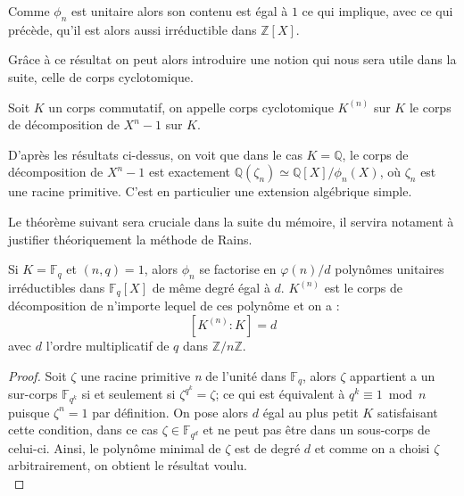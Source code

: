 \documentclass[a4paper]{article} %
\numberwithin{section}{part}
\numberwithin{equation}{section}
\newcommand\nroot[1]{\textit{#1}\up{\textit{ième}}}
\newcommand\zmodn[1]{\mathbb{Z}/#1\mathbb{Z}}
\newcommand\GF[1]{\mathbb{F}_{#1}}
\begin{document}
\begin{rem}
Comme $\phi_n$ est unitaire alors son contenu est égal à $1$ ce qui implique, 
avec ce qui précède, qu'il est alors aussi irréductible dans $\mathbb{Z}[X]$.
\end{rem}
\vspace{0.3cm}
Grâce à ce résultat on peut alors introduire une notion qui nous sera utile dans
la suite, celle de corps cyclotomique.

\begin{defn}
Soit $K$ un corps commutatif, on appelle corps cyclotomique $K^{(n)}$ sur $K$ le
corps de décomposition de $X^n - 1$ sur $K$.
\end{defn}

\begin{rem}
D'après les résultats ci-dessus, on voit que dans le cas $K = \mathbb{Q}$, le 
corps de décomposition de $X^n - 1$ est exactement $\mathbb{Q}(\zeta_n) \simeq 
\mathbb{Q}[X]/\phi_n(X)$, où $\zeta_n$ est une racine primitive. C'est en 
particulier une extension algébrique simple.
\end{rem}

Le théorème suivant sera cruciale dans la suite du mémoire, il servira notament 
à justifier théoriquement la méthode de Rains.

\begin{thm}
\label{polycycldecomp}
Si $K = \GF{q}$ et $(n,q) = 1$, alors $\phi_n$ se factorise en $\varphi(n)/d$ 
polynômes unitaires irréductibles dans $\GF{q}[X]$ de même degré égal à $d$. 
$K^{(n)}$ est le corps de décomposition de n'importe lequel de ces polynôme et 
on a :
\[[K^{(n)}:K] = d\]
avec $d$ l'ordre multiplicatif de $q$ dans $\zmodn{n}$.
\end{thm}
\begin{proof}
Soit $\zeta$ une racine primitive \nroot{n} de l'unité dans $\GF{q}$, alors 
$\zeta$ appartient a un sur-corps $\GF{q^k}$ si et seulement si $\zeta^{q^k} = 
\zeta$; ce qui est équivalent à $q^k \equiv 1 \bmod n$ puisque $\zeta^n = 1$ par
définition. On pose alors $d$ égal au plus petit $K$ satisfaisant cette 
condition, dans ce cas $\zeta\in\GF{q^d}$ et ne peut pas être dans un sous-corps
de celui-ci. Ainsi, le polynôme minimal de $\zeta$ est de degré $d$ et comme on 
a choisi $\zeta$ arbitrairement, on obtient le résultat voulu.\\
\end{proof}
\end{document}
